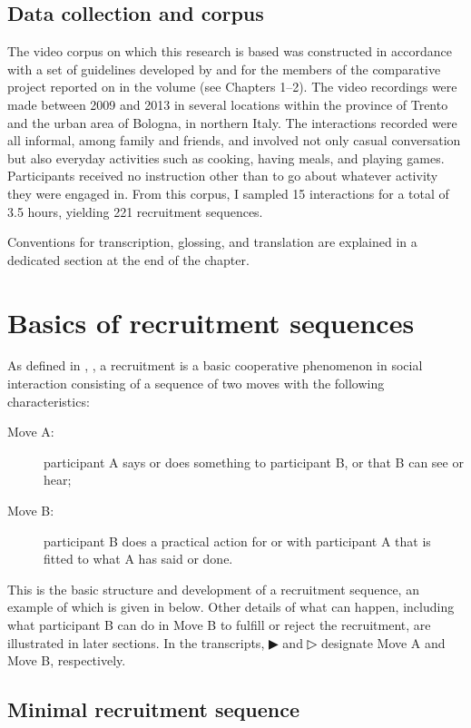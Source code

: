 \documentclass[output=paper,modfonts]{langscibook}
\begin{document}
\subsection{Data collection and corpus}\label{sec:rossi:1.2}
The video corpus on which this research is based was constructed in accordance with a set of guidelines developed by and for the members of the comparative project reported on in the volume (see Chapters 1--2). The video recordings were made between 2009 and 2013 in several locations within the province of Trento and the urban area of Bologna, in northern Italy. The interactions recorded were all informal, among family and friends, and involved not only casual conversation but also everyday activities such as cooking, having meals, and playing games. Participants received no instruction other than to go about whatever activity they were engaged in. From this corpus, I sampled 15 interactions for a total of 3.5 hours, yielding 221 recruitment sequences. 

Conventions for transcription, glossing, and translation are explained in a dedicated section at the end of the chapter.

\section{Basics of recruitment sequences}\label{sec:rossi:2}
As defined in , , a recruitment is a basic cooperative phenomenon in social interaction consisting of a sequence of two moves with the following characteristics:

\begin{description}
\item[Move A:] participant A says or does something to participant B, or that B can see or hear;
\item[Move B:] participant B does a practical action for or with participant A that is fitted to what A has said or done.
\end{description}

This is the basic structure and development of a recruitment sequence, an example of which is given in  below. Other details of what can happen, including what participant B can do in Move B to fulfill or reject the recruitment, are illustrated in later sections. In the transcripts, ▶ and ▷ designate Move A and Move B, respectively. 

\subsection{Minimal recruitment sequence}\label{sec:rossi:2.1}
\end{document}

